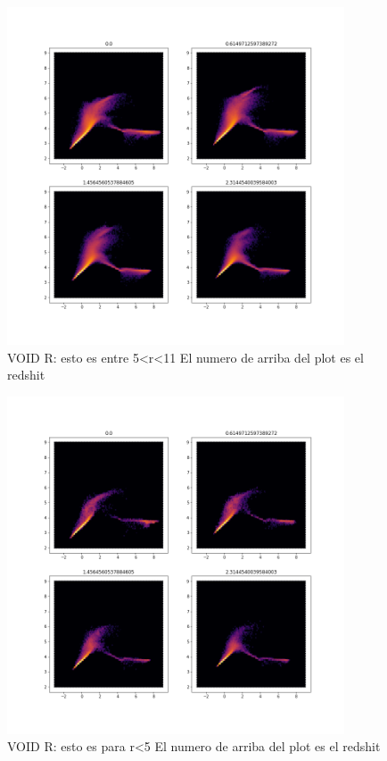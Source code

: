 \begin{figure}[h]
\centering
\includegraphics[width=10cm]{Figures/DF_wallR.png}
\decoRule
\caption[asd]{VOID R: esto es entre 5<r<11  El numero de arriba del plot es el redshit   }
\label{fig:Electron}
\end{figure}

\begin{figure}[h]
\centering
\includegraphics[width=10cm]{Figures/DF_inR.png}
\decoRule
\caption[asd]{VOID R: esto es para r<5  El numero de arriba del plot es el redshit   }
\label{fig:Electron}
\end{figure}

